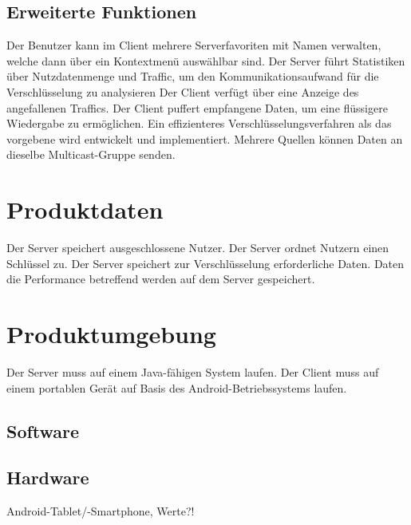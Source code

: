 \documentclass[a4paper,10pt]{article}
\begin{document}
\subsection{Erweiterte Funktionen}
\newcommand{\wunschKuerzel}{WU}
\begin{usecase}
 {Der Benutzer kann im Client mehrere Serverfavoriten
                  mit Namen verwalten, welche dann über ein Kontextmenü
                  auswählbar sind.}
 {Der Server führt Statistiken über Nutzdatenmenge und Traffic,
                  um den Kommunikationsaufwand für die Verschlüsselung zu
                  analysieren}
 {Der Client verfügt über eine Anzeige des angefallenen Traffics.}
 {Der Client puffert empfangene Daten, um eine flüssigere
                  Wiedergabe zu ermöglichen.}
 {Ein effizienteres Verschlüsselungsverfahren als das vorgebene
                  wird entwickelt und implementiert.}
 {Mehrere Quellen können Daten an dieselbe Multicast-Gruppe senden.}
\end{usecase}

\section{Produktdaten}
\newcommand{\datenKuerzel}{PD}
\begin{usecase}
\addrow{/\datenKuerzel10/} {Der Server speichert ausgeschlossene Nutzer.}
\addrow{/\datenKuerzel20/} {Der Server ordnet Nutzern einen Schlüssel zu.}
\addrow{/\datenKuerzel30/} {Der Server speichert zur Verschlüsselung erforderliche Daten.}
\addrow{/\datenKuerzel40/} {Daten die Performance betreffend werden auf dem Server gespeichert.}
\end{usecase}

\section{Produktumgebung}
Der Server muss auf einem Java-fähigen System laufen.
Der Client muss auf einem portablen Gerät auf Basis des Android-Betriebssystems laufen.
\subsection{Software}

\subsection{Hardware}
Android-Tablet/-Smartphone, Werte?!
\end{document}
